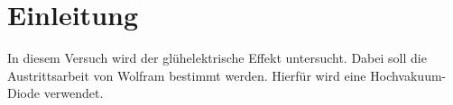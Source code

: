
\section{Einleitung}
In diesem Versuch wird der glühelektrische Effekt untersucht. Dabei soll die Austrittsarbeit von Wolfram bestimmt werden.
Hierfür wird eine Hochvakuum-Diode verwendet.